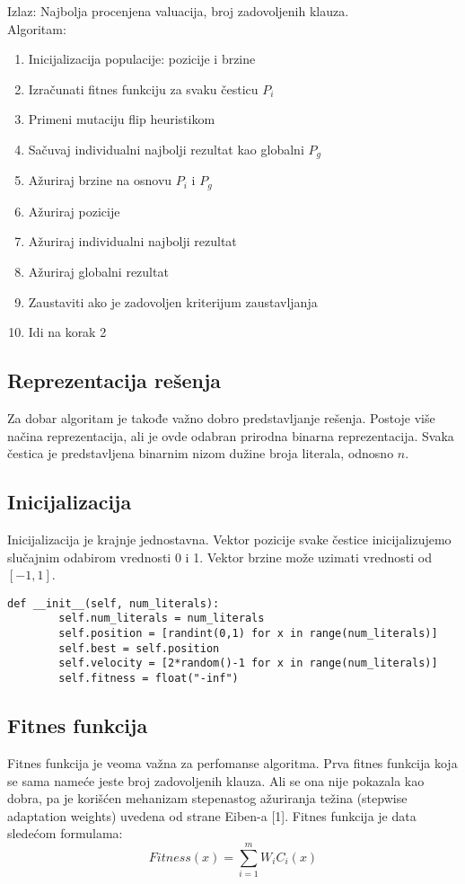 \documentclass{article}
\begin{document}
Izlaz: Najbolja procenjena valuacija, broj zadovoljenih klauza.\\

Algoritam:\

\begin{enumerate}
\item Inicijalizacija populacije: pozicije i brzine
\item Izračunati fitnes funkciju za svaku česticu $P_i$
\item Primeni mutaciju flip heuristikom
\item Sačuvaj individualni najbolji rezultat kao globalni $P_g$
\item Ažuriraj brzine na osnovu $P_i$ i $P_g$
\item Ažuriraj pozicije
\item Ažuriraj individualni najbolji rezultat
\item Ažuriraj globalni rezultat
\item Zaustaviti ako je zadovoljen kriterijum zaustavljanja
\item Idi na korak 2
\end{enumerate}


\subsection{Reprezentacija rešenja}
Za dobar algoritam je takođe važno dobro predstavljanje rešenja. Postoje više načina reprezentacija, ali je ovde odabran prirodna binarna reprezentacija. Svaka čestica je predstavljena binarnim nizom dužine broja literala, odnosno $n$.


\subsection{Inicijalizacija}
Inicijalizacija je krajnje jednostavna. Vektor pozicije svake čestice inicijalizujemo slučajnim odabirom vrednosti 0 i 1.  Vektor brzine može uzimati vrednosti od $[-1,1]$.

\begin{lstlisting}
def __init__(self, num_literals):
        self.num_literals = num_literals
        self.position = [randint(0,1) for x in range(num_literals)]
        self.best = self.position
        self.velocity = [2*random()-1 for x in range(num_literals)]
        self.fitness = float("-inf")
\end{lstlisting}

\subsection{Fitnes funkcija}
Fitnes funkcija je veoma važna za perfomanse algoritma.
Prva fitnes funkcija koja se sama nameće jeste broj zadovoljenih klauza. Ali se ona nije pokazala kao dobra, pa je korišćen mehanizam stepenastog ažuriranja težina (stepwise adaptation weights) uvedena od strane Eiben-a [1].
Fitnes funkcija je data sledećom formulama:
$$ Fitness(x) = \sum_{i=1}^{m} W_iC_i(x)$$
\end{document}
